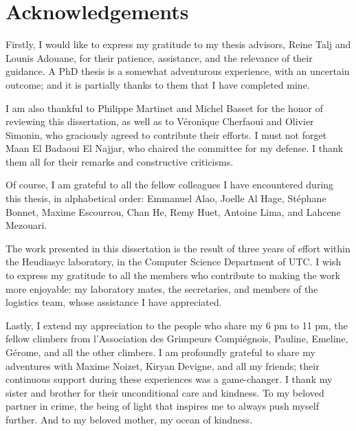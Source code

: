 \thispagestyle{empty}

\chapter{Acknowledgements}


Firstly, I would like to express my gratitude to my thesis advisors, Reine Talj and Lounis Adouane, for their patience, assistance, and the relevance of their guidance. A PhD thesis is a somewhat adventurous experience, with an uncertain outcome; and it is partially thanks to them that I have completed mine.

I am also thankful to Philippe Martinet and Michel Basset for the honor of reviewing this dissertation, as well as to Véronique Cherfaoui and Olivier Simonin, who graciously agreed to contribute their efforts. I must not forget Maan El Badaoui El Najjar, who chaired the committee for my defense. I thank them all for their remarks and constructive criticisms.

Of course, I am grateful to all the fellow colleagues I have encountered during this thesis, in alphabetical order: Emmanuel Alao, Joelle Al Hage, Stéphane Bonnet, Maxime Escourrou, Chan He, Remy Huet, Antoine Lima, and Lahcene Mezouari.

The work presented in this dissertation is the result of three years of effort within the Heudiasyc laboratory, in the Computer Science Department of UTC. I wish to express my gratitude to all the members who contribute to making the work more enjoyable: my laboratory mates, the secretaries, and members of the logistics team, whose assistance I have appreciated.

Lastly, I extend my appreciation to the people who share my 6 pm to 11 pm, the fellow climbers from l'Association des Grimpeurs Compiégnois, Pauline, Emeline, Gérome, and all the other climbers. I am profoundly grateful to share my adventures with Maxime Noizet, Kiryan Devigne, and all my friends; their continuous support during these experiences was a game-changer. I thank my sister and brother for their unconditional care and kindness. To my beloved partner in crime, the being of light that inspires me to always push myself further. And to my beloved mother, my ocean of kindness.
 \clearpage